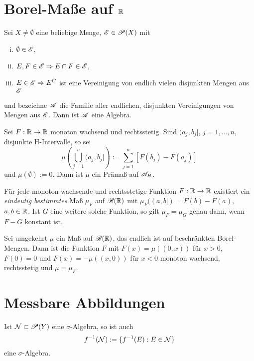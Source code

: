 \documentclass[
 a4paper,
 10pt,
 parskip=half
 ]{scrartcl}
\theoremstyle{plain}
\theoremstyle{definition}
\numberwithin{equation}{section}
\begin{document}
\section*{Borel-Maße auf \texorpdfstring{$\mathbb{R}$}{IR}}
\begin{lem}
 Sei $X \ne \emptyset$ eine beliebige Menge, $\mathscr{E} \in \mathscr{P}(X)$ mit
 \begin{enumerate}[(i)]
  \item $\emptyset \in \mathscr{E}$,
  \item $E,F \in \mathscr{E} \Rightarrow E \cap F \in \mathscr{E}$,
  \item $E \in \mathscr{E} \Rightarrow E^C$ ist eine Vereinigung von endlich vielen disjunkten Mengen aus $\mathscr{E}$
 \end{enumerate}
und bezeichne $\mathscr{A}$ die Familie aller endlichen, disjunkten Vereinigungen von Mengen aus $\mathscr{E}$. Dann ist $\mathscr{A}$ eine Algebra.
\end{lem}

\begin{lem}
  Sei $F: \mathbb{R} \to \mathbb{R}$ monoton wachsend und rechtsstetig. Sind $(a_j, b_j]$, $j= 1, \ldots, n$, disjunkte H-Intervalle, so sei
 \[ \mu \left( \bigcup_{j=1}^n (a_j, b_j] \right) := \sum_{j=1}^n [ F(b_j) - F(a_j) ] \]
 und $\mu( \emptyset ) := 0$. Dann ist $\mu$ ein Prämaß auf $\mathscr{A}_H$.
\end{lem} 

\begin{thm}
 Für jede monoton wachsende und rechtsstetige Funktion $F: \mathbb{R} \to \mathbb{R}$ existiert ein \emph{eindeutig bestimmtes} Maß $\mu_F$ auf $\mathscr{B}(\mathbb{R})$ mit $\mu_F( (a,b] ) = F(b) - F(a)$, $a,b \in \mathbb{R}$. Ist $G$ eine weitere solche Funktion, so gilt $\mu_F = \mu_G$ genau dann, wenn $F-G$ konstant ist.
 
 Sei umgekehrt $\mu$ ein Maß auf $\mathscr{B}(\mathbb{R})$, das endlich ist auf beschränkten Borel-Mengen. Dann ist die Funktion $F$ mit $F(x) = \mu((0,x))$ für $x>0$, $F(0) = 0$ und $F(x) = - \mu((x,0))$ für $x<0$ monoton wachsend, rechtsstetig und $\mu = \mu_F$.
\end{thm}

\section*{Messbare Abbildungen}
\begin{lem}
 Ist $\mathcal{N} \subset \mathscr{P}(Y)$ eine $\sigma$-Algebra, so ist auch
 \[ f^{-1}(\mathcal{N}) := \{ f^{-1}(E) : E \in \mathcal{N} \} \]
 eine $\sigma$-Algebra.
\end{lem}
\end{document}
